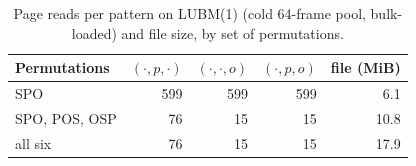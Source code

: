 \begin{table}[t]
\caption{Page reads per pattern on LUBM(1) (cold 64-frame pool, bulk-loaded) and file size, by set of permutations.}
\label{tab-permstudy}
\small
\begin{tabular}{@{}lrrrr@{}}
\toprule
Permutations & $(\cdot,p,\cdot)$ & $(\cdot,\cdot,o)$ & $(\cdot,p,o)$ & file (MiB) \\
\midrule
SPO & 599 & 599 & 599 & 6.1 \\
SPO, POS, OSP & 76 & 15 & 15 & 10.8 \\
all six & 76 & 15 & 15 & 17.9 \\
\bottomrule
\end{tabular}
\end{table}
